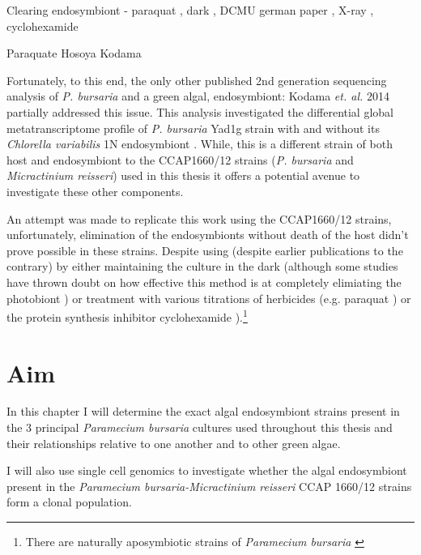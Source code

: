 Clearing endosymbiont - paraquat \citep{Hosoya1995a}, dark \citep{Karakashian1963}, DCMU german paper \citep{Reisser1976},
X-ray \citep{Wichterman1948}, cyclohexamide \citep{Weis1984,Kodama2007}



Paraquate Hosoya 
Kodama


Fortunately, to this end, the only other published 2nd generation sequencing analysis of \textit{P. bursaria} and a green algal,
endosymbiont: Kodama \textit{et. al.} 2014 \citep{Kodama2014} partially addressed this issue.  This analysis investigated 
the differential global metatranscriptome profile of \textit{P. bursaria} Yad1g strain with and without its \textit{Chlorella variabilis} 1N endosymbiont 
\citep{Kodama2014}.   While, this is a different strain of both host and endosymbiont to the CCAP1660/12 strains (\textit{P. bursaria} and \textit{Micractinium reisseri}) 
used in this thesis it offers a potential avenue to investigate these other components.


An attempt was made to replicate this work using the CCAP1660/12 strains, unfortunately, elimination of the endosymbionts without death of the host
didn't prove possible in these strains.  Despite using 
(despite earlier publications to the contrary) by either maintaining the culture in the dark \citep{Siegel1960} (although some studies have thrown doubt on
        how effective this method is at completely elimiating the photobiont \citep{Tanaka2002}) or treatment with various titrations of herbicides 
            (e.g. paraquat \citep{Hosoya1995a}) or the protein synthesis inhibitor cyclohexamide \citep{weis1984effect}).\footnote{
        There are naturally aposymbiotic strains of \textit{Paramecium bursaria} \citep{Tonooka2002a}}






\section{Aim}

In this chapter I will determine the exact algal endosymbiont strains present
in the 3 principal \textit{Paramecium bursaria} cultures used throughout
this thesis and their relationships relative to one another and to
other green algae.

I will also use single cell genomics to investigate whether the algal
endosymbiont present in the \textit{Paramecium bursaria-Micractinium reisseri}
CCAP 1660/12 strains form a clonal population. 

